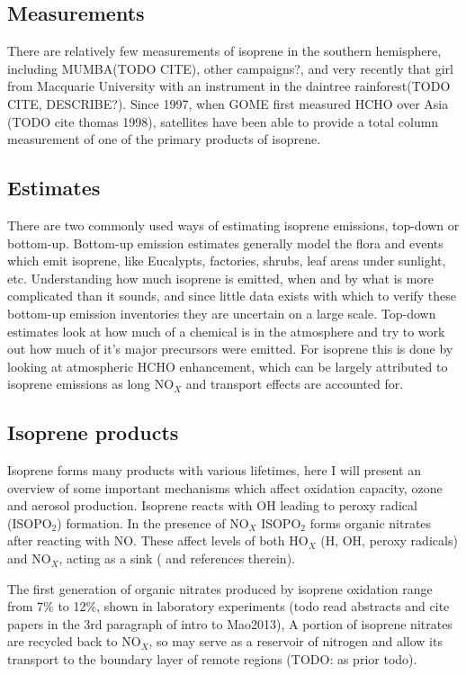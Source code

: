   \subsection{Measurements}
  
    There are relatively few measurements of isoprene in the southern hemisphere, including MUMBA(TODO CITE), other campaigns?, and very recently that girl from Macquarie University with an instrument in the daintree rainforest(TODO CITE, DESCRIBE?).
    Since 1997, when GOME first measured HCHO over Asia (TODO cite thomas 1998), satellites have been able to provide a total column measurement of one of the primary products of isoprene.
    
    
  \subsection{Estimates}
    There are two commonly used ways of estimating isoprene emissions, top-down or bottom-up.
    Bottom-up emission estimates generally model the flora and events which emit isoprene, like Eucalypts, factories, shrubs, leaf areas under sunlight, etc.
    Understanding how much isoprene is emitted, when and by what is more complicated than it sounds, and since little data exists with which to verify these bottom-up emission inventories they are uncertain on a large scale.
    Top-down estimates look at how much of a chemical is in the atmosphere and try to work out how much of it's major precursors were emitted.
    For isoprene this is done by looking at atmospheric HCHO enhancement, which can be largely attributed to isoprene emissions as long NO$_X$ and transport effects are accounted for.
  
  \subsection{Isoprene products}
    Isoprene forms many products with various lifetimes, here I will present an overview of some important mechanisms which affect oxidation capacity, ozone and aerosol production.
    Isoprene reacts with OH leading to peroxy radical (ISOPO$_2$) formation.
    In the presence of NO$_X$ ISOPO$_2$ forms organic nitrates after reacting with NO.
    These affect levels of both HO$_X$ (H, OH, peroxy radicals) and NO$_X$, acting as a sink (\citet{Mao2013} and references therein).
    
    The first generation of organic nitrates produced by isoprene oxidation range from 7\% to 12\%, shown in laboratory experiments (todo read abstracts and cite papers in the 3rd paragraph of intro to Mao2013),
    A portion of isoprene nitrates are recycled back to NO$_X$, so may serve as a reservoir of nitrogen and allow its transport to the boundary layer of remote regions (TODO: as prior todo).
    
